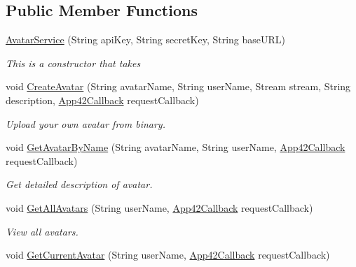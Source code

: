 \subsection*{Public Member Functions}
\begin{DoxyCompactItemize}
\item 
\hyperlink{classcom_1_1shephertz_1_1app42_1_1paas_1_1sdk_1_1windows_1_1avatar_1_1_avatar_service_aee1109ec6f3f50bd01b36b0445ecd4e2}{Avatar\+Service} (String api\+Key, String secret\+Key, String base\+U\+R\+L)
\begin{DoxyCompactList}\small\item\em This is a constructor that takes \end{DoxyCompactList}\item 
void \hyperlink{classcom_1_1shephertz_1_1app42_1_1paas_1_1sdk_1_1windows_1_1avatar_1_1_avatar_service_a38d0ebd5c1c936ea2a89155713ec9ca0}{Create\+Avatar} (String avatar\+Name, String user\+Name, Stream stream, String description, \hyperlink{interfacecom_1_1shephertz_1_1app42_1_1paas_1_1sdk_1_1windows_1_1_app42_callback}{App42\+Callback} request\+Callback)
\begin{DoxyCompactList}\small\item\em Upload your own avatar from binary. \end{DoxyCompactList}\item 
void \hyperlink{classcom_1_1shephertz_1_1app42_1_1paas_1_1sdk_1_1windows_1_1avatar_1_1_avatar_service_a564bc3fd4d4f449f28e1b6372af1224b}{Get\+Avatar\+By\+Name} (String avatar\+Name, String user\+Name, \hyperlink{interfacecom_1_1shephertz_1_1app42_1_1paas_1_1sdk_1_1windows_1_1_app42_callback}{App42\+Callback} request\+Callback)
\begin{DoxyCompactList}\small\item\em Get detailed description of avatar. \end{DoxyCompactList}\item 
void \hyperlink{classcom_1_1shephertz_1_1app42_1_1paas_1_1sdk_1_1windows_1_1avatar_1_1_avatar_service_ac369f338fca437ddc389e05f71c456c4}{Get\+All\+Avatars} (String user\+Name, \hyperlink{interfacecom_1_1shephertz_1_1app42_1_1paas_1_1sdk_1_1windows_1_1_app42_callback}{App42\+Callback} request\+Callback)
\begin{DoxyCompactList}\small\item\em View all avatars. \end{DoxyCompactList}\item 
void \hyperlink{classcom_1_1shephertz_1_1app42_1_1paas_1_1sdk_1_1windows_1_1avatar_1_1_avatar_service_a4230c5d9d8034de205ae97538db855f9}{Get\+Current\+Avatar} (String user\+Name, \hyperlink{interfacecom_1_1shephertz_1_1app42_1_1paas_1_1sdk_1_1windows_1_1_app42_callback}{App42\+Callback} request\+Callback)

\end{DoxyCompactItemize}
